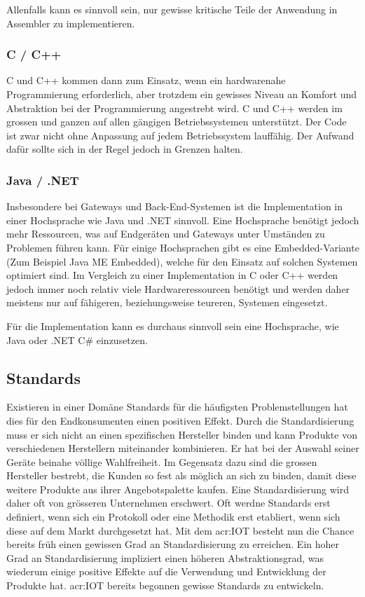 Allenfalls kann es sinnvoll sein, nur gewisse kritische Teile der Anwendung in Assembler zu implementieren.



\subsubsection{C / C++}
C und C++ kommen dann zum Einsatz, wenn ein hardwarenahe Programmierung erforderlich, aber trotzdem ein gewisses Niveau an Komfort und Abstraktion bei der Programmierung angestrebt wird. C und C++ werden im grossen und ganzen auf allen gängigen Betriebssystemen unterstützt. Der Code ist zwar nicht ohne Anpassung auf jedem Betriebssystem lauffähig. Der Aufwand dafür sollte sich in der Regel jedoch in Grenzen halten.



\subsubsection{Java / .NET}
Insbesondere bei Gateways und Back-End-Systemen ist die Implementation in einer Hochsprache wie Java und .NET sinnvoll.
Eine Hochsprache benötigt jedoch mehr Ressourcen, was auf Endgeräten und Gateways unter Umständen zu Problemen führen kann. Für einige Hochsprachen gibt es eine Embedded-Variante (Zum Beispiel Java ME Embedded), welche für den Einsatz auf solchen Systemen optimiert sind. Im Vergleich zu einer Implementation in C oder C++ werden jedoch immer noch relativ viele Hardwareressourcen benötigt und werden daher meistens nur auf fähigeren, beziehungsweise teureren, Systemen eingesetzt.

Für die Implementation kann es durchaus sinnvoll sein eine Hochsprache, wie Java oder .NET C\# einzusetzen. 



\subsection{Standards}
Existieren in einer Domäne Standards für die häufigsten Problemstellungen hat dies für den Endkonsumenten einen positiven Effekt. Durch die Standardisierung muss er sich nicht an einen spezifischen Hersteller binden und kann Produkte von verschiedenen Herstellern miteinander kombinieren. Er hat bei der Auswahl seiner Geräte beinahe völlige Wahlfreiheit. Im Gegensatz dazu sind die grossen Hersteller bestrebt, die Kunden so fest als möglich an sich zu binden, damit diese weitere Produkte aus ihrer Angebotspalette kaufen. Eine Standardisierung wird daher oft von grösseren Unternehmen erschwert. Oft werdne Standards erst definiert, wenn sich ein Protokoll oder eine Methodik erst etabliert, wenn sich diese auf dem Markt durchgesetzt hat. Mit dem \gls{acr:IOT} besteht nun die Chance bereits früh einen gewissen Grad an Standardisierung zu erreichen. Ein hoher Grad an Standardisierung impliziert einen höheren Abstraktionsgrad, was wiederum einige positive Effekte auf die Verwendung und Entwicklung der Produkte hat. \gls{acr:IOT} bereits begonnen gewisse Standards zu entwickeln. 
 

